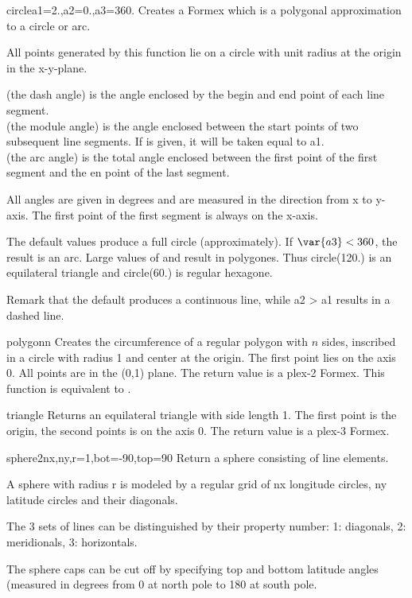 \begin{funcdesc}{circle}{a1=2.,a2=0.,a3=360.}
Creates a Formex which is a polygonal approximation to a circle or arc.

All points generated by this function lie on a circle with unit radius at the origin in the x-y-plane.

 (the dash angle) is the angle enclosed by the begin and end point of each line segment.\\
 (the module angle) is the angle enclosed between the start points of two subsequent line segments. 
If  is given, it will be taken equal to a1.\\
 (the arc angle) is the total angle enclosed between the first point of the first segment and the en point of the last segment.

All angles are given in degrees and are measured in the direction from x to y-axis. The first point of the first segment is always on the x-axis.

The default values produce a full circle (approximately). If $\var{a3} < 360$, the result is an arc.
Large values of  and  result in polygones. Thus circle(120.) is an
equilateral triangle and circle(60.) is regular hexagone.

Remark that the default  produces a continuous line, while a2 > a1 results in a dashed line.

\end{funcdesc}


\begin{funcdesc}{polygon}{n}
Creates the circumference of a regular polygon with $n$ sides, inscribed in a circle with radius 1 and center at the origin. The first point lies on the axis 0. All points are in the (0,1) plane. 
The return value is a plex-2 Formex. 
This function is equivalent to .
\end{funcdesc}


\begin{funcdesc}{triangle}{}
Returns an equilateral triangle with side length 1. The first point is the origin, the second points is on the axis 0. The return value is a plex-3 Formex.
\end{funcdesc}


\begin{funcdesc}{sphere2}{nx,ny,r=1,bot=-90,top=90}
Return a sphere consisting of line elements.

A sphere with radius r is modeled by a regular grid of nx
longitude circles, ny latitude circles and their diagonals.
    
The 3 sets of lines can be distinguished by their property number:
1: diagonals, 2: meridionals, 3: horizontals.

The sphere caps can be cut off by specifying top and bottom latitude
angles (measured in degrees from 0 at north pole to 180 at south pole.
\end{funcdesc}

